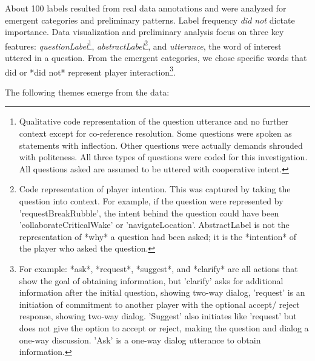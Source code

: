 About 100 labels resulted from real data annotations and were analyzed for
emergent categories and preliminary patterns. Label frequency \emph{did not}
dictate importance. Data visualization and preliminary analysis focus on three
key features: \emph{questionLabel}\footnote{Qualitative code representation of the
question utterance and no further context except for co-reference resolution.
Some questions were spoken as statements with inflection. Other questions were
actually demands shrouded with politeness. All three types of questions were
coded for this investigation. All questions asked are assumed to be uttered
with cooperative intent.}, \emph{abstractLabel}\footnote{Code representation of
player intention. This was captured by taking the question into context. For
example, if the question were represented by 'requestBreakRubble', the intent
behind the question could have been 'collaborateCriticalWake' or
'navigateLocation'. AbstractLabel is not the representation of *why* a
question had been asked; it is the *intention* of the player who asked the
question.}, and \emph{utterance}, the word of interest uttered in a question. From
the emergent categories, we chose specific words that did or *did not*
represent player interaction\footnote{For example: *ask*, *request*,
*suggest*, and *clarify* are all actions that show the goal of
obtaining information, but 'clarify' asks for additional information after the
initial question, showing two-way dialog, 'request' is an initiation of
commitment to another player with the optional accept/ reject response, showing
two-way dialog. 'Suggest' also initiates like 'request' but does not give the
option to accept or reject, making the question and dialog a one-way
discussion. 'Ask' is a one-way dialog utterance to obtain information.}. 

The following themes emerge from the data:

